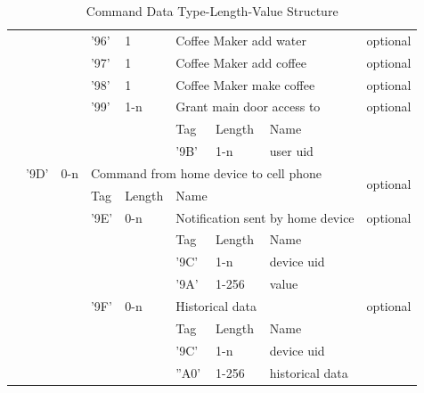 \begin{table}[!htb]
{\begin{tabular}{|l|l|l|l|l|l|l|l|l|l|}
\multicolumn{2}{|l|}{} & \multicolumn{2}{l|}{} & '96' & 1 & \multicolumn{3}{l|}{Coffee Maker add water} & optional \\ \cline{5-10} 
\multicolumn{2}{|l|}{} & \multicolumn{2}{l|}{} & '97' & 1 & \multicolumn{3}{l|}{Coffee Maker add coffee} & optional \\ \cline{5-10} 
\multicolumn{2}{|l|}{} & \multicolumn{2}{l|}{} & '98' & 1 & \multicolumn{3}{l|}{Coffee Maker make coffee} & optional \\ \cline{5-10} 
\multicolumn{2}{|l|}{} & \multicolumn{2}{l|}{} & '99' & 1-n & \multicolumn{3}{l|}{Grant main door access to} & optional \\ \cline{5-10} 
\multicolumn{2}{|l|}{} & \multicolumn{2}{l|}{} & \multicolumn{2}{l|}{\multirow{2}{*}{}} & Tag & Length & Name & \multirow{2}{*}{} \\ \cline{7-9}
\multicolumn{2}{|l|}{} & \multicolumn{2}{l|}{} & \multicolumn{2}{l|}{} & '9B' & 1-n & user uid &  \\ \cline{3-10} 
\multicolumn{2}{|l|}{} & '9D' & 0-n & \multicolumn{5}{l|}{Command from home device to cell phone} & \multirow{2}{*}{optional} \\ \cline{3-9}
\multicolumn{2}{|l|}{} & \multicolumn{2}{l|}{\multirow{9}{*}{}} & Tag & Length & \multicolumn{3}{l|}{Name} &  \\ \cline{5-10} 
\multicolumn{2}{|l|}{} & \multicolumn{2}{l|}{} & '9E' & 0-n & \multicolumn{3}{l|}{Notification sent by home device} & optional \\ \cline{5-10} 
\multicolumn{2}{|l|}{} & \multicolumn{2}{l|}{} & \multicolumn{2}{l|}{\multirow{3}{*}{}} & Tag & Length & Name & \multirow{3}{*}{} \\ \cline{7-9}
\multicolumn{2}{|l|}{} & \multicolumn{2}{l|}{} & \multicolumn{2}{l|}{} & '9C' & 1-n & device uid &  \\ \cline{7-9}
\multicolumn{2}{|l|}{} & \multicolumn{2}{l|}{} & \multicolumn{2}{l|}{} & '9A' & 1-256 & value &  \\ \cline{5-10} 
\multicolumn{2}{|l|}{} & \multicolumn{2}{l|}{} & '9F' & 0-n & \multicolumn{3}{l|}{Historical data} & optional \\ \cline{5-10} 
\multicolumn{2}{|l|}{} & \multicolumn{2}{l|}{} & \multicolumn{2}{l|}{\multirow{3}{*}{}} & Tag & Length & Name & \multirow{3}{*}{} \\ \cline{7-9}
\multicolumn{2}{|l|}{} & \multicolumn{2}{l|}{} & \multicolumn{2}{l|}{} & '9C' & 1-n & device uid &  \\ \cline{7-9}
\multicolumn{2}{|l|}{} & \multicolumn{2}{l|}{} & \multicolumn{2}{l|}{} & ''A0' & 1-256 & historical data &  \\ \hline
\end{tabular}
}
\caption{Command Data Type-Length-Value Structure}
\label{tlv}
\end{table}

